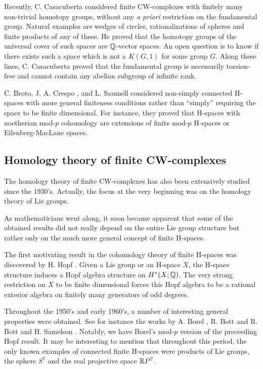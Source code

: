 Recently, C. Casacuberta considered finite CW-complexes with finitely many non-trivial homotopy groups, without any {\it a priori} restriction on the fundamental group. Natural examples are wedges of circles, rationalizations of spheres and finite products of any of these. He proved that the homotopy groups of the universal cover of such spaces are $\mathbb{Q}$-vector spaces. An open question is to know if there exists such a space which is not a $K(G,1)$ for some group $G$. Along these lines, C. Casacuberta proved that the fundamental group is necessarily torsion-free and cannot contain any abelian subgroup of infinite rank.

C. Broto, J. A. Crespo \cite{BC99}, and L. Saumell \cite{BCS01} considered non-simply connected H-spaces with more general finiteness conditions rather than ``simply'' requiring the space to be finite dimensional. For instance, they proved that H-spaces with noetherian mod-$p$ cohomology are extensions of finite mod-$p$ H-spaces or Eilenberg-MacLane spaces.

\subsection{Homology theory of finite CW-complexes}
The homology theory of finite CW-complexes has also been extensively studied since the 1930's. Actually, the focus at the very beginning was on the homology theory of Lie groups. 

As mathematicians went along, it soon became apparent that some of the obtained results did not really depend on the entire Lie group structure but rather only on the much more general concept of finite H-spaces. 

The first motivating result in the cohomology theory of finite H-spaces was discovered by H. Hopf \cite{Ho40}. Given a Lie group or an H-space $X$, the H-space structure induces a Hopf algebra structure on $H^*(X;\mathbb{Q})$. The very strong restriction on $X$ to be finite dimensional forces this Hopf algebra to be a rational exterior algebra on finitely many generators of odd degrees. 

Throughout the 1950's and early 1960's, a number of interesting general properties were obtained. See for instance the works by A. Borel \cite{Bo53} \cite{Bo54} \cite{Bo55}, R. Bott \cite{Bot54} \cite{Bot56} \cite{Bot58} and R. Bott and H. Samelson \cite{BS53}. Notably, we have Borel's mod-$p$ version of the preceeding Hopf result. It may be interesting to mention that throughout this period, the only known examples of connected finite H-spaces were products of Lie groups, the sphere $S^7$ and the real projective space $\mathbb{R} P^7$.

